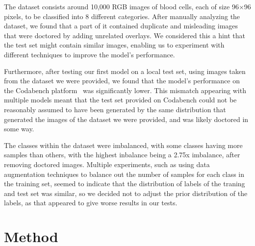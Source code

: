 \documentclass[11pt]{article}
\begin{document}
\begin{multicols}{2}

      The dataset consists around 10,000 RGB images of blood cells, each
      of size 96\(\times\)96 pixels, to be classified into 8 different
      categories. After manually analyzing the dataset, we found that
      a part of it contained duplicate and misleading images that were doctored
      by adding unrelated overlays. We considered this a hint that the test set
      might contain similar images, enabling us to experiment with different
      techniques to improve the model's performance.

      Furthermore, after testing our first model on a local test set, using images
      taken from the dataset we were provided, we found that the model's 
      performance on the Codabench platform~\cite{codabench} was significantly lower. This mismatch
      appearing with multiple models meant that the test set provided on Codabench
      could not be reasonably assumed to have been generated by the same distribution
      that generated the images of the dataset we were provided, and was likely
      doctored in some way.

      The classes within the dataset were imbalanced, with some classes having
      more samples than others, with the highest inbalance being a 2.75x imbalance,
      after removing doctored images. Multiple experiments, such as using data 
      augmentation techniques to balance out the number of samples for each class 
      in the training set, seemed to indicate that the distribution of labels of 
      the traning and test set was similar, so we decided not to adjust the prior 
      distribution of the labels, as that appeared to give worse results in our tests.

      \section{Method}


\end{multicols}
\end{document}
